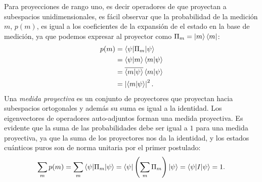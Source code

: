 \documentclass[a4paper]{report}
\begin{document}
  Para proyecciones de rango uno, es decir operadores de que
  proyectan a subespacios unidimensionales, es fácil
  observar que la probabilidad de la medición $m$, $p(m)$,
  es igual a los coeficientes de la expansión de el estado
  en la base de medición, ya que podemos expresar al
  proyector como $\Pi_m = \ket m \bra m$:
  \begin{align}
    p(m)
    &= \braket{\psi|\Pi_m|\psi} \\
    &= \braket{\psi|m} \braket{m|\psi} \\
    &= \overline{\braket{m|\psi}} \braket{m|\psi} \\
    &= \left|\langle m|\psi \rangle\right|^2.
  \end{align}
  Una \textit{medida proyectiva} es un conjunto de
  proyectores que proyectan hacia subespacios ortogonales y
  además su suma es igual a la identidad. Los eigenvectores
  de operadores auto-adjuntos forman una medida proyectiva.
  Es evidente que la suma de las probabilidades debe ser
  igual a $1$ para una medida proyectiva, ya que la suma de
  los proyectores nos da la identidad, y los estados
  cuánticos puros son de norma unitaria por el primer
  postulado:
  \begin{equation}
    \sum_{m}^{} p(m)
    = \sum_{m}^{} \braket{\psi|\Pi_m|\psi}
    = \braket{\psi|\left( \sum_{m}^{} \Pi_m \right)|\psi}
    = \braket{\psi|I|\psi}
    = 1.
  \end{equation}
\end{document}

